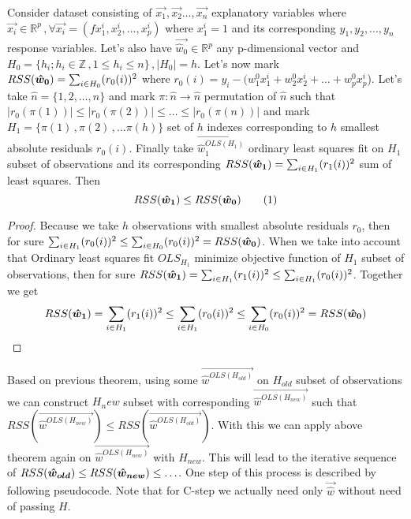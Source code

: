 \begin{theorem}
Consider dataset consisting of
$\vec{x_1}, \vec{x_2} \ldots,\vec{x_n}$ explanatory variables where 
$\vec{x_i}\in\mathbb{R}^p\,, \forall \vec{x_i} = (fx^i_1, x^i_2,\ldots,x^i_p)$ where $x^i_1 = 1$
and its corresponding $y_1, y_2,\ldots,y_n$ response variables. 
Let's also have $\vec{\hat{w}_0}\in\mathbb{R}^p$ any p-dimensional vector and 
$H_0 = \{{h_i ; h_i \in\mathbb{Z}\,, 1 \leq h_i \leq n\}}\,, |H_0| = h$. 
Let's now mark $RSS(\boldsymbol{\hat{w}_0}) = \sum_{i\in H_0} (r_0(i))^2$ where 
$r_0(i) = y_i - (w_1^0x^i_1 + w_2^0x^i_2 +\ldots+ w_p^0x^i_p$).
Let's take $\hat{n} = \{{1,2,\ldots,n\}}$ and mark
$\pi: \hat{n} \rightarrow \hat{n}$ permutation of $\hat{n}$ such that $|r_0({\pi(1)})| \leq |r_0({\pi(2)})| \leq \ldots \leq |r_0({\pi(n)})|$
and mark $H_1 = \{{\pi(1)\,, \pi(2)\,,... \pi(h)\}}$ set of $h$ indexes corresponding to $h$ smallest absolute residuals $r_0(i)$.
Finally take $\vec{\hat{w}^{OLS(H_1)}_1 }$ ordinary least squares fit on $H_1$ subset of observations
and its corresponding $RSS(\boldsymbol{\hat{w}_1}) = \sum_{i\in H_1} (r_1(i))^2$ sum of least squares. Then
\[ 
	RSS(\what{1}) \leq RSS(\what{0}) \numberthis
\]
\end{theorem}

\begin{proof}
	Because we take $h$ observations with smallest absolute residuals $r_0$, then for sure $\sum_{i\in H_1} (r_0(i))^2 \leq \sum_{i\in H_0} (r_0(i))^2 =  RSS(\boldsymbol{\hat{w}_0})$.
	When we take into account that Ordinary least squares fit $OLS_{H_1}$ minimize objective function of 
	$H_1$ subset of observations, then for sure  $RSS(\boldsymbol{\hat{w}_1}) =  \sum_{i\in H_1} (r_1(i))^2 \leq \sum_{i\in H_1} (r_0(i))^2$.
	Together we get $$RSS(\boldsymbol{\hat{w}_1})=\sum_{i\in H_1}(r_1(i))^2\leq\sum_{i\in H_1}(r_0(i))^2\leq\sum_{i\in H_0}(r_0(i))^2=RSS(\boldsymbol{\hat{w}_0})$$
\end{proof}


\begin{corollary} 
	Based on previous theorem, using some $\vec{\hat{w}^{OLS(H_{old})}}$  on $H_{old}$ subset of observations we can
	construct $H_new$ subset with corresponding $\vec{\hat{w}^{OLS(H_{new})}}$ such that $RSS(\vec{\hat{w}^{OLS(H_{new})}}) \leq RSS(\vec{\hat{w}^{OLS(H_{old})}})$. 
	With this we can apply above theorem again on $\vec{\hat{w}^{OLS(H_{new})}}$ with $H_{new}$. This will lead to the iterative sequence of
	$RSS(\boldsymbol{\hat{w}_{old}}) \leq RSS(\boldsymbol{\hat{w}_{new}}) \leq \ldots$. One step of this process is described by following pseudocode. Note that for C-step we actually need only $\vec{\hat{w}}$ 
	 without need of passing  $H$.
\end{corollary}

